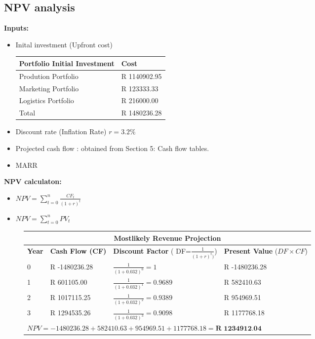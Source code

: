 \documentclass{article}
\begin{document}
  \subsection{NPV analysis}
  \textbf{Inputs: }
  \begin{itemize}
    \item Inital investment (Upfront cost) \\
      \begin{tabular}{|l|l|} \hline
        \textbf{Portfolio Initial Investment} & \textbf{Cost} \\ \hline
        Prodution Portfolio & R 1140902.95 \\ \hline
        Marketing Portfolio & R  123333.33 \\ \hline
        Logistics Portfolio & R  216000.00 \\ \hline
        Total &  R 1480236.28 \\ \hline
      \end{tabular}
    \item Discount rate (Inflation Rate) $r = 3.2\%$ \cite{inflate}
    \item Projected cash flow : obtained from Section 5: Cash flow tables.
    \item MARR 
  \end{itemize}
  \textbf{NPV calculaton:} \\
    \begin{itemize}
      \item $NPV = \sum_{t=0}^{n} \frac{CF_t}{(1 + r)^t}$
      \item $NPV = \sum_{t=0}^{n} PV_t$
    \end{itemize}
  \begin{figure}[H]
    \large
    \begin{tabular}{|l|l|l|l|} \hline 
      \multicolumn{4}{|c|}{\textbf{Mostlikely Revenue Projection}} \\ \hline
      \textbf{Year} & \textbf{Cash Flow (CF)} & \textbf{Discount Factor} (
      DF=$\frac{1}{(1+r)^t)}$) & \textbf{Present Value} ($DF \times CF$) \\
      \hline
      0 & R -1480236.28 & $\frac{1}{(1+0.032)^0}=1$ & R     -1480236.28 \\ \hline
      1 & R   601105.00 & $\frac{1}{(1+0.032)^1}=0.9689$ & R  582410.63 \\ \hline
      2 & R  1017115.25 & $\frac{1}{(1+0.032)^2}=0.9389$ & R  954969.51 \\ \hline
      3 & R  1294535.26 & $\frac{1}{(1+0.032)^3}=0.9098$ & R 1177768.18 \\ \hline
      \multicolumn{4}{|l|}{\textbf{$NPV =
      -1480236.28+582410.63+954969.51+1177768.18 = \textbf{R 1234912.04}$  
}} \\ \hline
    \end{tabular}
  \end{figure}
\end{document}
